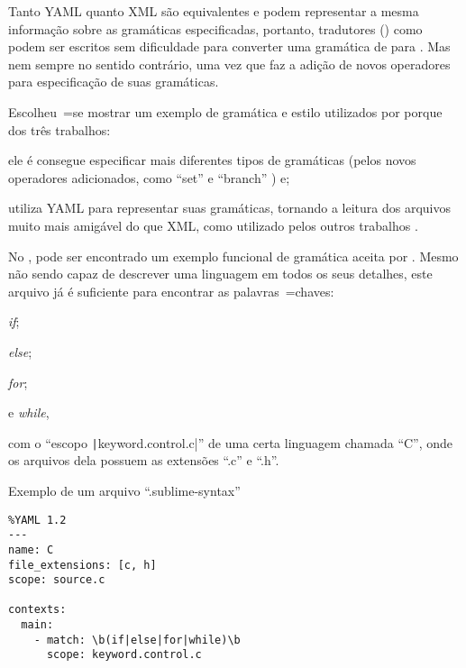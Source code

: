 Tanto YAML quanto XML são equivalentes e
podem representar a mesma informação sobre as gramáticas especificadas,
portanto,
tradutores () como  podem ser escritos sem dificuldade para converter uma gramática de  para .
Mas nem sempre no sentido contrário,
uma vez que  faz a adição de novos operadores para especificação de suas gramáticas.

Escolheu~=se mostrar um exemplo de gramática e
estilo utilizados por  porque dos três trabalhos:
\begin{inparaenum}[1)]
\item ele é consegue especificar mais diferentes tipos de gramáticas (pelos novos operadores adicionados,
como ``set'' e
``branch'' \cite{branchTemporarilyHighlightsWrong}) e;
\item utiliza YAML para representar suas gramáticas,
tornando a leitura dos arquivos muito mais amigável do que XML,
como utilizado pelos outros trabalhos \cite{textMateEditor,vsCodeSyntaxHighlighthing}.
\end{inparaenum}%
No ,
pode ser encontrado um exemplo funcional de gramática aceita por .
Mesmo não sendo capaz de descrever uma linguagem em todos os seus detalhes,
este arquivo já é suficiente para encontrar as palavras~=chaves:
\begin{inparaenum}[1)]
\item \textit{if};
\item \textit{else};
\item \textit{for};
\item e
\textit{while},
\end{inparaenum}%
com o ``escopo \texttt|keyword.control.c|'' de uma certa linguagem chamada ``C'',
onde os arquivos dela possuem as extensões ``.c'' e
``.h''.
\begin{code}
\caption{Exemplo de um arquivo ``.sublime-syntax''}
\label{code:exemploDeUmArquivoSublimeSyntax}
\begin{verbatim}
%YAML 1.2
---
name: C
file_extensions: [c, h]
scope: source.c

contexts:
  main:
    - match: \b(if|else|for|while)\b
      scope: keyword.control.c
\end{verbatim}
\xpretocmd{\ABNTEXfontereduzida}{\setlength{\belowcaptionskip}{-13pt}}{}{}
\vspace{13pt}
\end{code}

